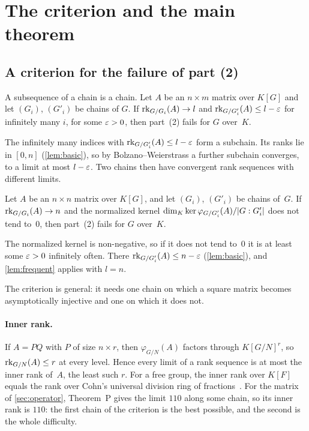 \section{The criterion and the main theorem}\label{sec:main}

\subsection{A criterion for the failure of part (2)}\label{sec:criterion}

\begin{lemma}\label{lem:frequent}
A subsequence of a chain is a chain. Let $A$ be an $n\times m$ matrix over $K[G]$ and let $(G_i)$, $(G'_i)$ be chains of
$G$. If $\operatorname{rk}_{G/G_i}(A)\to l$ and $\operatorname{rk}_{G/G'_i}(A)\le l-\varepsilon$ for infinitely many $i$, for some $\varepsilon>0$, then part~(2)
fails for $G$ over~$K$.
\end{lemma}
\begin{outline}
The infinitely many indices with $\operatorname{rk}_{G/G'_i}(A)\le l-\varepsilon$ form a subchain. Its ranks lie in $[0,n]$
(\cref{lem:basic}), so by Bolzano--Weierstrass a further subchain converges, to a limit at most $l-\varepsilon$. Two chains
then have convergent rank sequences with different limits.
\end{outline}

\begin{proposition}\label{prop:criterion}
Let $A$ be an $n\times n$ matrix over $K[G]$, and let $(G_i)$, $(G'_i)$ be chains of~$G$. If $\operatorname{rk}_{G/G_i}(A)\to n$ and the
normalized kernel $\dim_K\ker\varphi_{G/G'_i}(A)/\lvert G:G'_i \rvert$ does not tend to~$0$, then part~(2) fails for $G$
over~$K$.
\end{proposition}
\begin{outline}
The normalized kernel is non-negative, so if it does not tend to~$0$ it is at least some $\varepsilon>0$ infinitely often.
There $\operatorname{rk}_{G/G'_i}(A)\le n-\varepsilon$ (\cref{lem:basic}), and \cref{lem:frequent} applies with $l=n$.
\end{outline}

The criterion is general: it needs one chain on which a square matrix becomes asymptotically injective and one on which it
does not.

\paragraph{Inner rank.} If $A=PQ$ with $P$ of size $n\times r$, then $\varphi_{G/N}(A)$ factors through $K[G/N]^r$, so
$\operatorname{rk}_{G/N}(A)\le r$ at every level. Hence every limit of a rank sequence is at most the inner rank of~$A$, the least such
$r$. For a free group, the inner rank over $K[F]$ equals the rank over Cohn's universal division ring of
fractions~\cite{Cohn2006,JaikinSouza2026}. For the matrix of \cref{sec:operator}, Theorem~P gives the limit $110$ along some
chain, so its inner rank is $110$: the first chain of the criterion is the best possible, and the second is the whole
difficulty.

